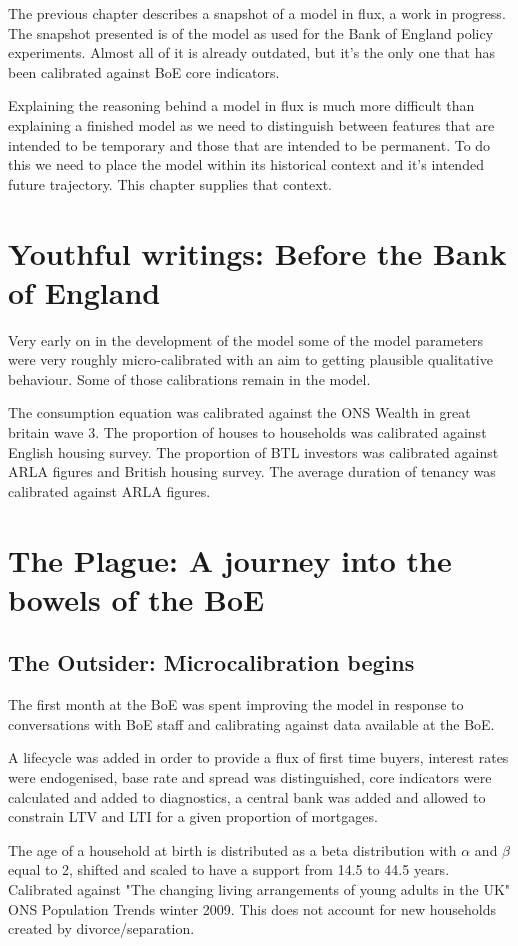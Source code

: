 \documentclass{report}
\begin{document}
The previous chapter describes a snapshot of a model in flux, a work in progress. The snapshot presented is of the model as used for the Bank of England policy experiments. Almost all of it is already outdated, but it's the only one that has been calibrated against BoE core indicators.

Explaining the reasoning behind a model in flux is much more difficult than explaining a finished model as we need to distinguish between features that are intended to be temporary and those that are intended to be permanent. To do this we need to place the model within its historical context and it's intended future trajectory. This chapter supplies that context.

\section{Youthful writings: Before the Bank of England}
Very early on in the development of the model some of the model parameters were very roughly micro-calibrated with an aim to getting plausible qualitative behaviour. Some of those calibrations remain in the model.

The consumption equation was calibrated against the ONS Wealth in great britain wave 3. The proportion of houses to households was calibrated against English housing survey. The proportion of BTL investors was calibrated against ARLA figures and British housing survey. The average duration of tenancy was calibrated against ARLA figures.

\section{The Plague: A journey into the bowels of the BoE}

\subsection{The Outsider: Microcalibration begins}
The first month at the BoE was spent improving the model in response to conversations with BoE staff and calibrating against data available at the BoE.

A lifecycle was added in order to provide a flux of first time buyers, interest rates were endogenised, base rate and spread was distinguished, core indicators were calculated and added to diagnostics, a central bank was added and allowed to constrain LTV and LTI for a given proportion of mortgages.

The age of a household at birth is distributed as a beta distribution with $\alpha$ and $\beta$ equal to 2, shifted and scaled to have a support from 14.5 to 44.5 years. Calibrated against "The changing living arrangements of young adults in the UK" ONS Population Trends winter 2009. This does not account for new households created by divorce/separation.
\end{document}
